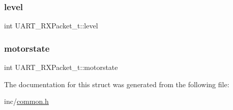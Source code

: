 \mbox{\label{struct_u_a_r_t___r_x_packet__t_affe75dc489fae21968abbd37cfb8ae12}} 
\subsubsection{\texorpdfstring{level}{level}}
{\footnotesize\ttfamily int U\+A\+R\+T\+\_\+\+R\+X\+Packet\+\_\+t\+::level}

\mbox{\label{struct_u_a_r_t___r_x_packet__t_a598dbd9b07a1a0f4bd1b1d943be3966d}} 
\subsubsection{\texorpdfstring{motorstate}{motorstate}}
{\footnotesize\ttfamily int U\+A\+R\+T\+\_\+\+R\+X\+Packet\+\_\+t\+::motorstate}



The documentation for this struct was generated from the following file\+:\begin{DoxyCompactItemize}
\item 
inc/\mbox{\hyperlink{common_8h}{common.\+h}}\end{DoxyCompactItemize}

